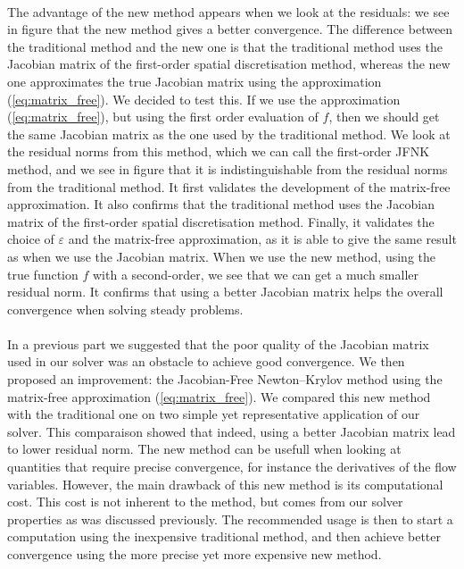         \paragraph{}
        The advantage of the new method appears when we look at the residuals: we see in figure  that the new method gives a better convergence.
        The difference between the traditional method and the new one is that the traditional method uses the Jacobian matrix of the first-order spatial discretisation method, whereas the new one approximates the true Jacobian matrix using the approximation (\ref{eq:matrix_free}).
        We decided to test this.
        If we use the approximation (\ref{eq:matrix_free}), but using the first order evaluation of $f$, then we should get the same Jacobian matrix as the one used by the traditional method.
        We look at the residual norms from this method, which we can call the first-order JFNK method, and we see in figure  that it is indistinguishable from the residual norms from the traditional method.
        It first validates the development of the matrix-free approximation.
        It also confirms that the traditional method uses the Jacobian matrix of the first-order spatial discretisation method.
        Finally, it validates the choice of $\varepsilon$ and the matrix-free approximation, as it is able to give the same result as when we use the Jacobian matrix.
        When we use the new method, using the true function $f$ with a second-order, we see that we can get a much smaller residual norm.
        It confirms that using a better Jacobian matrix helps the overall convergence when solving steady problems.


    \paragraph{}
    In a previous part we suggested that the poor quality of the Jacobian matrix used in our solver was an obstacle to achieve good convergence.
    We then proposed an improvement: the Jacobian-Free Newton--Krylov method using the matrix-free approximation (\ref{eq:matrix_free}).
    We compared this new method with the traditional one on two simple yet representative application of our solver.
    This comparaison showed that indeed, using a better Jacobian matrix lead to lower residual norm.
    The new method can be usefull when looking at quantities that require precise convergence, for instance the derivatives of the flow variables.
    However, the main drawback of this new method is its computational cost.
    This cost is not inherent to the method, but comes from our solver properties as was discussed previously.
    The recommended usage is then to start a computation using the inexpensive traditional method, and then achieve better convergence using the more precise yet more expensive new method.


